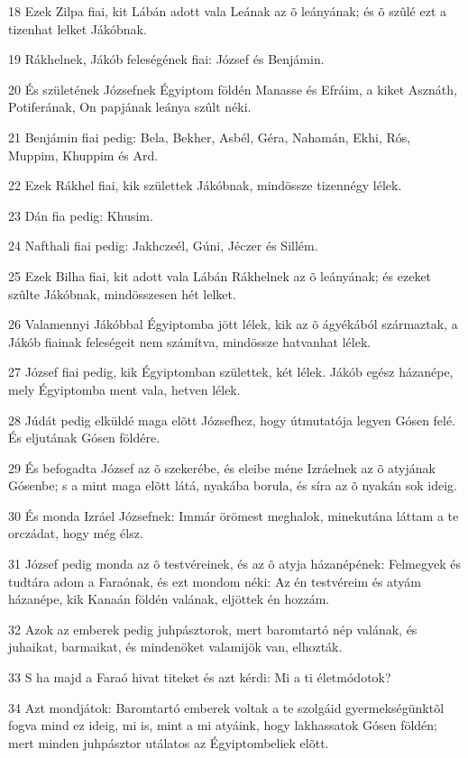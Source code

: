 \par 18 Ezek Zilpa fiai, kit Lábán adott vala Leának az õ leányának; és õ szûlé ezt a tizenhat lelket Jákóbnak.
\par 19 Rákhelnek, Jákób feleségének fiai: József és Benjámin.
\par 20 És születének Józsefnek Égyiptom földén Manasse és Efráim, a kiket Asznáth, Potiferának, On papjának leánya szûlt néki.
\par 21 Benjámin fiai pedig: Bela, Bekher, Asbél, Géra, Nahamán, Ekhi, Rós, Muppim, Khuppim és Ard.
\par 22 Ezek Rákhel fiai, kik születtek Jákóbnak, mindössze tizennégy lélek.
\par 23 Dán fia pedig: Khusim.
\par 24 Nafthali fiai pedig: Jakhczeél, Gúni, Jéczer és Sillém.
\par 25 Ezek Bilha fiai, kit adott vala Lábán Rákhelnek az õ leányának; és ezeket szûlte Jákóbnak, mindösszesen hét lelket.
\par 26 Valamennyi Jákóbbal Égyiptomba jött lélek, kik az õ ágyékából származtak, a Jákób fiainak feleségeit nem számítva, mindössze hatvanhat lélek.
\par 27 József fiai pedig, kik Égyiptomban születtek, két lélek. Jákób egész házanépe, mely Égyiptomba ment vala, hetven lélek.
\par 28 Júdát pedig elküldé maga elõtt Józsefhez, hogy útmutatója legyen Gósen felé. És eljutának Gósen földére.
\par 29 És befogadta József az õ szekerébe, és eleibe méne Izráelnek az õ atyjának Gósenbe; s a mint maga elõtt látá, nyakába borula, és síra az õ nyakán sok ideig.
\par 30 És monda Izráel Józsefnek: Immár örömest meghalok, minekutána láttam a te orczádat, hogy még élsz.
\par 31 József pedig monda az õ testvéreinek, és az õ atyja házanépének: Felmegyek és tudtára adom a Faraónak, és ezt mondom néki: Az én testvéreim és atyám házanépe, kik Kanaán földén valának, eljöttek én hozzám.
\par 32 Azok az emberek pedig juhpásztorok, mert baromtartó nép valának, és juhaikat, barmaikat, és mindenöket valamijök van, elhozták.
\par 33 S ha majd a Faraó hivat titeket és azt kérdi: Mi a ti életmódotok?
\par 34 Azt mondjátok: Baromtartó emberek voltak a te szolgáid gyermekségünktõl fogva mind ez ideig, mi is, mint a mi atyáink, hogy lakhassatok Gósen földén; mert minden juhpásztor utálatos az Égyiptombeliek elõtt.

